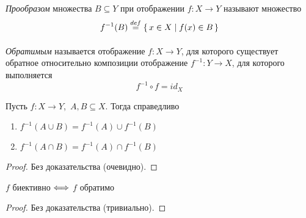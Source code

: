 \begin{definition}
    \textit{Прообразом} множества $B \subseteq Y$ при отображении
    $f \colon X \to Y$ называют множество
\[
    f^{-1}(B) \overset{def}{\underset{}{=}} \{\, x \in X \mid f(x) \in B \,\}
\]
\end{definition}

\begin{definition}
    \textit{Обратимым} называется отображение $f \colon X \to Y$, для которого
    существует обратное относительно композиции отображение
    $f^{-1} \colon Y \to X$, для которого выполняется
\[
    f^{-1} \circ f = id_X
\]
\end{definition}

\begin{theorem}
    Пусть $f \colon X \to Y$, \,$A, B \subseteq X$. Тогда справедливо
    \begin{enumerate}
        \item $f^{-1}(A \cup B) = f^{-1}(A) \cup f^{-1}(B)$
        \item $f^{-1}(A \cap B) = f^{-1}(A) \cap f^{-1}(B)$
    \end{enumerate}
\end{theorem}
\begin{proof}
    Без доказательства (очевидно).
\end{proof}

\begin{theorem}
    $f$ биективно $\Longleftrightarrow$ $f$ обратимо
\end{theorem}
\begin{proof}
    Без доказательства (тривиально).
\end{proof}

\newpage

